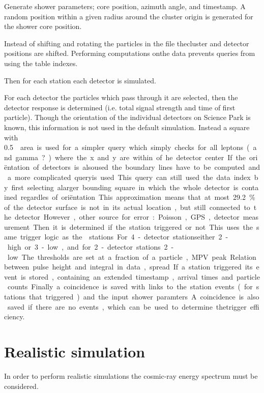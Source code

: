Generate shower parameters; core position, azimuth angle, and timestamp. A random position within a given radius around the cluster origin is generated for the shower core position.

Instead of shifting and rotating the particles in the \corsika file thecluster and detector positions are shifted. Performing computations onthe \corsika data prevents queries from using the table indexes.

Then for each station each detector is simulated.

For each detector the particles which pass through it are selected, then the detector response is determined (i.e. total signal strength and time of first particle). Though the orientation of the individual detectors on Science Park is known, this information is not used in the default simulation. Instead a square with \SI{.5}{\meter\square} area is used for a simpler query which simply checks for all leptons (and gamma?) where the x and y are within .. of he detector center. If the oriëntation of detectors is alsoused the boundary lines have to be computed and a more complicated queryis used. This query can still used the data index by first selecting alarger bounding square in which the whole detector is contained regardles of oriëntation. This approximation means that at most\SI{29.2}{\percent} of the detector surface is not in its actual location, but still connected to the detector. However, other source for error: Poisson, GPS, detector measurement.

Then it is determined if the station triggered or not. This uses the same trigger logic as the \hisparc stations. For 4-detector stationseither 2-high or 3-low, and for 2-detector stations 2-low. The thresholds are set at a fraction of a particle, MPV peak.. Relation between pulse height and integral in data, spread..

If a station triggered its event is stored, containing an extended timestamp, arrival times and particle counts.

Finally a coincidence is saved with links to the station events (for stations that triggered) and the input shower paramters. A coincidence is also saved if there are no events, which can be used to determine thetrigger efficiency.


\section{Realistic simulation}


In order to perform realistic simulations the cosmic-ray energy spectrum must be considered.


